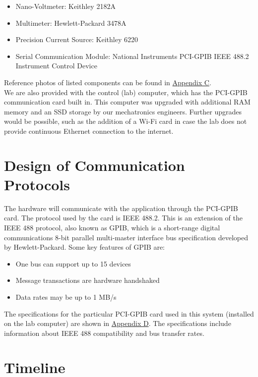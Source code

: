 \documentclass[12pt, titlepage]{article}
\begin{document}
  \begin{itemize}
    \item Nano-Voltmeter: Keithley 2182A
    \item Multimeter: Hewlett-Packard 3478A
    \item Precision Current Source: Keithley 6220
    \item Serial Communication Module: National Instruments PCI-GPIB IEEE 488.2 Instrument Control Device
  \end{itemize}

\noindent Reference photos of listed components can be found in \hyperref[Apx.C]{Appendix C}. \\

\noindent We are also provided with the control (lab) computer, which has the PCI-GPIB communication card built in. This computer was upgraded with additional RAM memory and an SSD storage by our mechatronics engineers. Further upgrades would be possible, such as the addition of a Wi-Fi card in case the lab does not provide continuous Ethernet connection to the internet. \\

\section{Design of Communication Protocols}

\noindent The hardware will communicate with the application through the PCI-GPIB card. The protocol used by the card is IEEE 488.2. This is an extension of the IEEE 488 protocol, also known as GPIB, which is a short-range digital communications 8-bit parallel multi-master interface bus specification developed by Hewlett-Packard. Some key features of GPIB are:
\begin{itemize}
	\item One bus can support up to 15 devices
	\item Message transactions are hardware handshaked
	\item Data rates may be up to 1 MB/s
\end{itemize}
\noindent The specifications for the particular PCI-GPIB card used in this system (installed on the lab computer) are shown in \hyperref[Apx.D]{Appendix D}. The specifications include information about IEEE 488 compatibility and bus transfer rates.

\section{Timeline}
\end{document}

